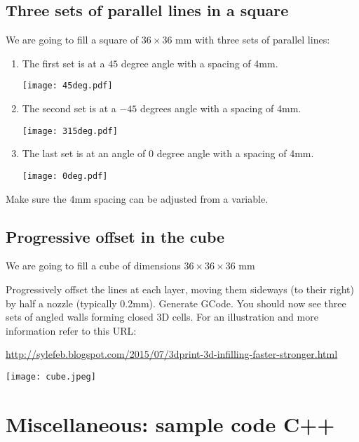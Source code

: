 \documentclass{article}
\begin{document}
\subsection{Three sets of parallel lines in a square}

We are going to fill a square of $36 \times 36$ mm with three sets of parallel lines:

\begin{enumerate}
\item The first set is at a $45$ degree angle with a spacing of 4mm.

\begin{center}
\texttt{[image: 45deg.pdf]}
\end{center}
\item The second set is at a $-45$ degrees angle with a spacing of 4mm.

\begin{center}
\texttt{[image: 315deg.pdf]}
\end{center}
\item The last set is at an angle of $0$ degree angle with a spacing of 4mm.

\begin{center}
\texttt{[image: 0deg.pdf]}
\end{center}
\end{enumerate}

Make sure the 4mm spacing can be adjusted from a variable.


\subsection{Progressive offset in the cube}

We are going to fill a cube of dimensions $36 \times 36 \times 36$ mm

Progressively offset the lines at each layer, moving them sideways (to their right) by half a nozzle (typically 0.2mm). Generate GCode. You should now see three sets of angled walls forming closed 3D cells. For an illustration and more information refer to this URL:

\url{http://sylefeb.blogspot.com/2015/07/3dprint-3d-infilling-faster-stronger.html}

\begin{center}
\texttt{[image: cube.jpeg]}
\end{center}


\section{Miscellaneous: sample code C++}
\end{document}
